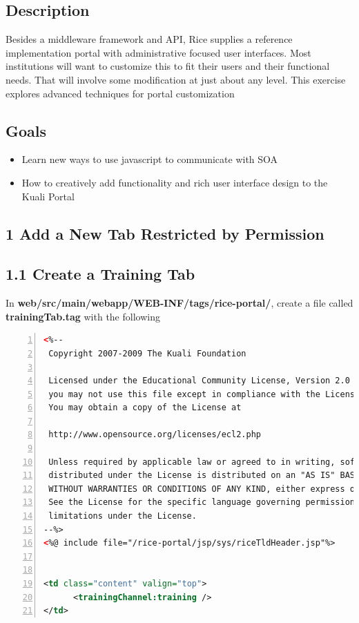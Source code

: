 \subsection*{Description}
Besides a middleware framework and API, Rice supplies a reference
implementation portal with administrative focused user
interfaces. Most institutions will want to customize this to fit their
users and their functional needs. That will involve some modification
at just about any level. This exercise explores advanced techniques
for portal customization

\subsection*{Goals}
\begin{itemize}
  \item Learn new ways to use javascript to communicate with SOA 
  \item How to creatively add functionality and rich user interface
    design to the Kuali Portal
\end{itemize}

\subsection*{1 Add a New Tab Restricted by Permission}

\subsection*{1.1 Create a Training Tab}
In \textbf{web/src/main/webapp/WEB-INF/tags/rice-portal/}, create a
file called \textbf{trainingTab.tag} with the following
\begin{lstlisting}[basicstyle=\scriptsize,numbers=left,language=xml,backgroundcolor=\color{ubergray},caption={web/src/main/webapp/WEB-INF/tags/rice-portal/trainingTab.tag},frame=single,breaklines=true]
<%--
 Copyright 2007-2009 The Kuali Foundation
 
 Licensed under the Educational Community License, Version 2.0 (the "License");
 you may not use this file except in compliance with the License.
 You may obtain a copy of the License at
 
 http://www.opensource.org/licenses/ecl2.php
 
 Unless required by applicable law or agreed to in writing, software
 distributed under the License is distributed on an "AS IS" BASIS,
 WITHOUT WARRANTIES OR CONDITIONS OF ANY KIND, either express or implied.
 See the License for the specific language governing permissions and
 limitations under the License.
--%>
<%@ include file="/rice-portal/jsp/sys/riceTldHeader.jsp"%>


<td class="content" valign="top">      
      <trainingChannel:training />
</td>

\end{lstlisting}

